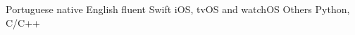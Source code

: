\begin{cvskills}
  \cvskill
    {Portuguese}
    {native}
  \cvskill
    {English}
    {fluent}
  \cvskill
    {Swift}
    {iOS, tvOS and watchOS}
  \cvskill
    {Others}
    {Python, C/C++}
\end{cvskills}
